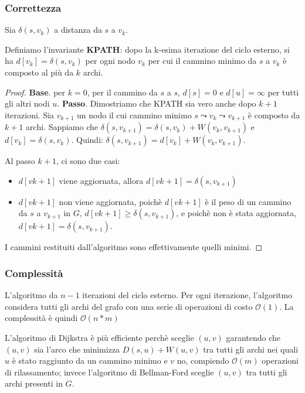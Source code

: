 \documentclass[11pt]{article}
\begin{document}
\subsubsection{Correttezza}
Sia $\delta(s,v_k)$ a distanza da $s$ a $v_k$.

Definiamo l'invariante \textbf{KPATH}: dopo la k-esima iterazione del ciclo esterno, si ha $d[v_k]=\delta(s,v_k)$ per ogni 
nodo $v_k$ per cui il cammino minimo da $s$ a $v_k$ è composto al più da $k$ archi.
\begin{proof}
    \textbf{Base}. per $k=0$, per il cammino da $s$ a $s$, $d[s]=0$ e $d[u]=\infty$ per tutti gli altri nodi $u$. 
    \textbf{Passo}. Dimostriamo che KPATH sia vero anche dopo $k+1$ iterazioni. Sia $v_{k+1}$ un nodo il cui cammino minimo 
    $s\leadsto v_k\leadsto v_{k+1}$ è composto da $k+1$ archi. Sappiamo che $\delta(s,v_{k+1})=\delta(s,v_k)+W(v_k,v_{k+1})$
    e $d[v_k]=\delta(s,v_k)$. Quindi: $\delta(s,v_{k+1})=d[v_k]+W(v_k,v_{k+1})$.

    Al passo $k+1$, ci sono due casi:
    \begin{itemize}
        \item $d[v{k+1}]$ viene aggiornata, allora $d[v{k+1}]=\delta(s,v_{k+1})$
        \item $d[v{k+1}]$ non viene aggiornata, poichè $d[v{k+1}]$ è il peso di un cammino da $s$ a $v_{k+1}$ in $G$, 
        $d[v{k+1}]\geq \delta(s,v_{k+1})$, e poichè non è stata aggiornata, $d[v{k+1}]=\delta(s,v_{k+1})$.
    \end{itemize}
    I cammini restituiti dall'algoritmo sono effettivamente quelli minimi.
\end{proof}
\subsubsection{Complessità}
L'algoritmo da $n-1$ iterazioni del ciclo esterno. Per ogni iterazione, l'algoritmo considera tutti gli archi del grafo 
con una serie di operazioni di costo $\mathcal{O}(1)$. La complessità è quindi $\mathcal{O}(n*m)$

L'algoritmo di Dijkstra è più efficiente perchè sceglie $(u,v)$ garantendo che $(u,v)$ sia l'arco che minimizza $D(s,u)+W(u,v)$
tra tutti gli archi nei quali $u$ è stato raggiunto da un cammino minimo e $v$ no, compiendo $\mathcal{O}(m)$ operazioni 
di rilassamento; invece l'algoritmo di Bellman-Ford sceglie $(u,v)$ tra tutti gli archi presenti in $G$.
\end{document}
